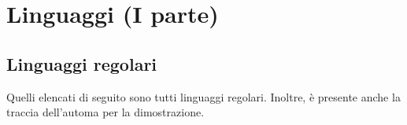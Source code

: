 \documentclass[a4paper,oneside,titlepage]{book}
\begin{document}
\begin{frontespizio}
\end{frontespizio}

\frontmatter
\tableofcontents

\mainmatter
\chapter{Linguaggi (I parte)}

\section{Linguaggi regolari}
Quelli elencati di seguito sono tutti linguaggi regolari. Inoltre, è presente anche la traccia dell'automa per la dimostrazione.
\end{document}
